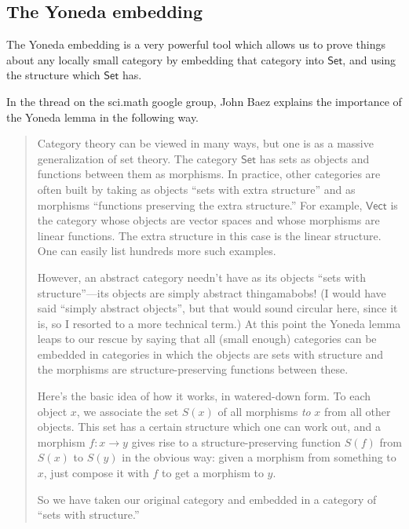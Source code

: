 \documentclass[a4paper,10pt]{scrreprt}
\theoremstyle{definition}
\theoremstyle{plain}
\theoremstyle{remark}
\begin{document}
\subsection{The Yoneda embedding}
The Yoneda embedding is a very powerful tool which allows us to prove things about any locally small category by embedding that category into $\mathsf{Set}$, and using the structure which $\mathsf{Set}$ has. 

In the thread \cite{baez-categories-usenet} on the sci.math google group, John Baez explains the importance of the Yoneda lemma in the following way.

\begin{quote}
  Category theory can be viewed in many ways, but one is as a massive generalization of set theory.  The category $\mathsf{Set}$ has sets as objects and functions between them as morphisms.  In practice, other categories are often built by taking as objects ``sets with extra structure'' and as morphisms ``functions preserving the extra structure.''  For example, $\mathsf{Vect}$ is the category whose objects are vector spaces and whose morphisms are linear functions.  The extra structure in this case is the linear structure.  One can easily list hundreds more such examples.  

  However, an abstract category needn't have as its objects ``sets with structure''---its objects are simply abstract thingamabobs!  (I would have said ``simply abstract objects'', but that would sound circular here, since it is, so I resorted to a more technical term.)  At this point the Yoneda lemma leaps to our rescue by saying that all (small enough) categories can be embedded in categories in which the objects are sets with structure and the morphisms are structure-preserving functions between these.  

  Here's the basic idea of how it works, in watered-down form.  To each object $x$, we associate the set $S(x)$ of all morphisms \textit{to} $x$ from all other objects.  This set has a certain structure which one can work out, and a morphism $f\colon x \to y$ gives rise to a structure-preserving function $S(f)$ from $S(x)$ to $S(y)$ in the obvious way: given a morphism from something to $x$, just compose it with $f$ to get a morphism to $y$.

  So we have taken our original category and embedded in a category of ``sets with structure.''
\end{quote}
\end{document}
